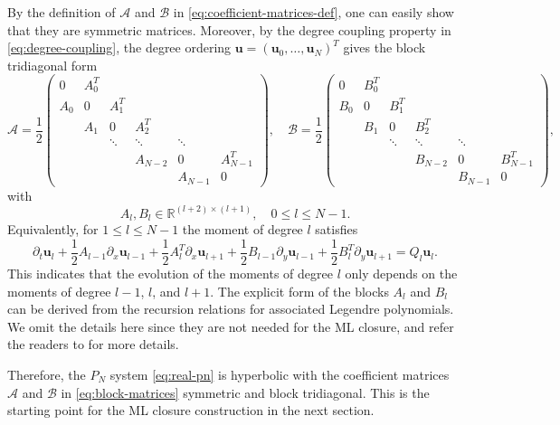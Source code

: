 \documentclass[11pt]{article}
\numberwithin{equation}{section}
\newcommand{\vect}[1]{\boldsymbol{#1}}
\newcommand{\half}{\frac{1}{2}}
\begin{document}
By the definition of $\mathcal{A}$ and $\mathcal{B}$ in \eqref{eq:coefficient-matrices-def}, one can easily show that they are symmetric matrices. Moreover, by the degree coupling property in \eqref{eq:degree-coupling}, the degree ordering $\vect{u}=(\vect{u}_0,\dots,\vect{u}_N)^T$ gives the block tridiagonal form
\begin{equation}\label{eq:block-matrices}
\mathcal{A} = \half
\begin{pmatrix}
0 & A_0^T \\
A_0 & 0 & A_1^T \\
& A_1 & 0 & A_2^T \\
& & \ddots & \ddots & \ddots \\
& & & A_{N-2} & 0 & A_{N-1}^T \\
& & & & A_{N-1} & 0
\end{pmatrix},
\quad
\mathcal{B} = \half
\begin{pmatrix}
0 & B_0^T \\
B_0 & 0 & B_1^T \\
& B_1 & 0 & B_2^T \\
& & \ddots & \ddots & \ddots \\
& & & B_{N-2} & 0 & B_{N-1}^T \\
& & & & B_{N-1} & 0
\end{pmatrix},
\end{equation}
with
\begin{equation}
A_l,B_l\in\mathbb R^{(l+2)\times(l+1)}, \quad 0\le l\le N-1.
\end{equation}
Equivalently, for $1\le l\le N-1$ the moment of degree $l$ satisfies
\begin{equation}\label{eq:block-equation}
\partial_t\vect{u}_l +\half A_{l-1}\partial_x\vect{u}_{l-1} +\half A_{l}^T\partial_x\vect{u}_{l+1} +\half B_{l-1}\partial_y\vect{u}_{l-1} +\half B_{l}^T\partial_y\vect{u}_{l+1} = Q_l\vect{u}_l.
\end{equation}
This indicates that the evolution of the moments of degree $l$ only depends on the moments of degree $l-1$, $l$, and $l+1$. The explicit form of the blocks $A_l$ and $B_l$ can be derived from the recursion relations for associated Legendre polynomials. We omit the details here since they are not needed for the ML closure, and refer the readers to \cite{seibold2014starmap} for more details.





Therefore, the $P_N$ system \eqref{eq:real-pn} is hyperbolic with the coefficient matrices $\mathcal{A}$ and $\mathcal{B}$ in \eqref{eq:block-matrices} symmetric and block tridiagonal. This is the starting point for the ML closure construction in the next section.
\end{document}

